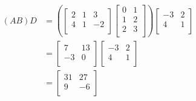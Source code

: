 \documentclass{article}
\begin{document}
\begin{align*}
    (AB)D &=
    \left(
    \begin{bmatrix}
        2 & 1 & 3\\
        4 & 1 & -2\\
    \end{bmatrix}
    \begin{bmatrix}
        0 & 1\\
        1 & 2\\
        2 & 3\\
    \end{bmatrix}
    \right)
    \begin{bmatrix}
        -3 & 2\\
        4 & 1\\
    \end{bmatrix}\\
    &=
    \begin{bmatrix}
        7 & 13\\
        -3 & 0\\
    \end{bmatrix}
    \begin{bmatrix}
        -3 & 2\\
        4 & 1\\
    \end{bmatrix}\\
    &=
    \begin{bmatrix}
        31 & 27\\
        9 & -6\\
    \end{bmatrix}
\end{align*}
\end{document}
